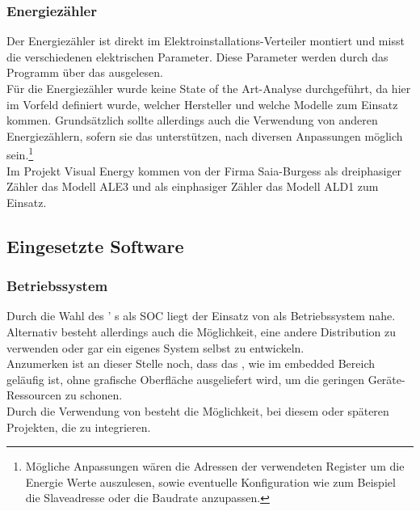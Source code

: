 \documentclass[Bachelorarbeit.tex]{subfiles}
\begin{document}
\subsubsection*{Energiezähler}
Der Energiezähler ist direkt im Elektroinstallations-Verteiler montiert und misst die 
verschiedenen elektrischen Parameter. Diese Parameter werden durch das Programm 
über das  ausgelesen. \\
Für die Energiezähler wurde keine State of the Art-Analyse durchgeführt, da hier im 
Vorfeld definiert wurde, welcher Hersteller und welche Modelle zum Einsatz kommen. 
Grundsätzlich sollte allerdings auch die Verwendung von anderen Energiezählern, sofern 
sie das  unterstützen, nach diversen Anpassungen möglich sein.\footnote{Mögliche Anpassungen wären die Adressen der verwendeten Register um die Energie Werte auszulesen, sowie 
eventuelle Konfiguration wie zum Beispiel die Slaveadresse oder die Baudrate anzupassen.}\\
Im Projekt Visual Energy kommen von der Firma Saia-Burgess als dreiphasiger Zähler das
Modell ALE3 und als einphasiger Zähler das Modell ALD1 zum Einsatz.


\subsection{Eingesetzte Software}
\subsubsection*{Betriebssystem}
Durch die Wahl des ' s als \ac{SOC} liegt der Einsatz von  als Betriebssystem nahe. Alternativ besteht allerdings auch die 
Möglichkeit, eine andere Distribution zu verwenden oder gar ein eigenes System selbst zu 
entwickeln.\\
Anzumerken ist an dieser Stelle noch, dass das , wie im embedded Bereich geläufig ist, ohne grafische Oberfläche ausgeliefert wird, um die geringen Geräte-Ressourcen zu schonen.\\
Durch die Verwendung von  besteht die Möglichkeit, bei diesem oder 
späteren Projekten, die  zu integrieren.
\end{document}
